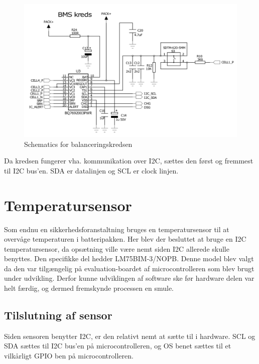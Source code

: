 \begin{figure}[h]
	\centering
	\includegraphics[width=15cm]{billeder/bms_ic_sch.png}
	\caption{Schematics for balanceringskredsen}
	\label{fig:temp_sensor}
\end{figure}

Da kredsen fungerer vha. kommunikation over I2C, sættes den først og fremmest til I2C bus'en. SDA er datalinjen og SCL er clock linjen. \\


\section{Temperatursensor}
Som endnu en sikkerhedsforanstaltning bruges en temperatursensor til at overvåge temperaturen i batteripakken. Her blev der besluttet at bruge en I2C temperatursensor, da opsætning ville være nemt siden I2C allerede skulle benyttes. Den specifikke del hedder LM75BIM-3/NOPB. Denne model blev valgt da den var tilgængelig på evaluation-boardet af microcontrolleren som blev brugt under udvikling. Derfor kunne udviklingen af software ske før hardware delen var helt færdig, og dermed fremskynde processen en smule. \\

\subsection{Tilslutning af sensor}
Siden sensoren benytter I2C, er den relativt nemt at sætte til i hardware. SCL og SDA sættes til I2C bus'en på microcontrolleren, og OS benet sættes til et vilkårligt GPIO ben på microcontrolleren. 


